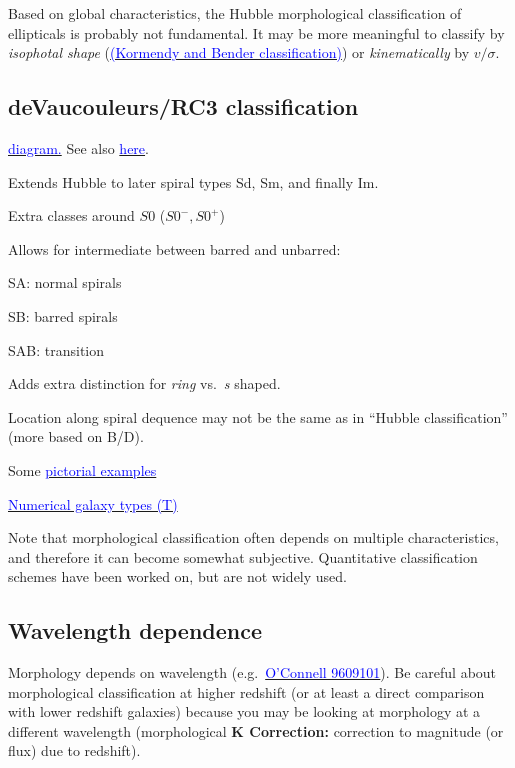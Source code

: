 \documentclass[12pt]{article}
\begin{document}
Based on global characteristics, the Hubble morphological classification of
ellipticals is probably not fundamental.
It may be more meaningful to classify by \emph{isophotal shape}
(\href{http://astronomy.as.virginia.edu}
{\textcolor{blue}{(Kormendy and Bender classification)}})
or \emph{kinematically} by $v/\sigma$.

\subsection*{deVaucouleurs/RC3 classification}
\href{http://astronomy.nmsu.edu/holtz/a555/html/diagrams/a616/rc3class.htm}
{\textcolor{blue}{diagram.}}
See also
\href{http://astronomy.as.virginia.edu}
{\textcolor{blue}{here}}.
\begin{itemize*}
    \item Extends Hubble to later spiral types Sd, Sm, and finally Im.
    \item Extra classes around $S0$ ($S0^{-}, S0^{+}$)
    \item Allows for intermediate between barred and unbarred:
        \begin{itemize*}
            \item SA: normal spirals
            \item SB: barred spirals
            \item SAB: transition
        \end{itemize*}
    \item Adds extra distinction for \emph{ring} vs.\ \emph{s} shaped.
    \item Location along spiral dequence may not be the same as in
        ``Hubble classification'' (more based on B/D).
    \item Some \href{http://astronomy.as.virginia.edu}
        {\textcolor{blue}{pictorial examples}}
    \item \href{http://astronomy.nmsu.edu/holtz/a555/html/diagrams/a616/numtype.htm}
        {\textcolor{blue}{Numerical galaxy types (T)}}
\end{itemize*}
Note that
morphological classification often depends on multiple characteristics,
and therefore it can become somewhat subjective. Quantitative classification
schemes have been worked on, but are not widely used.

\subsection*{Wavelength dependence}
Morphology depends on wavelength
(e.g.\ \href{http://ned.ipac.caltech.edu/level5/Kuchinski/frames.html}
{\textcolor{blue}{O'Connell 9609101}}).
Be careful about morphological classification at higher redshift
(or at least a direct comparison with lower redshift galaxies)
because you may be looking at morphology at a different wavelength
(morphological \textbf{K Correction:} correction to magnitude (or flux) due
to redshift).
\end{document}
